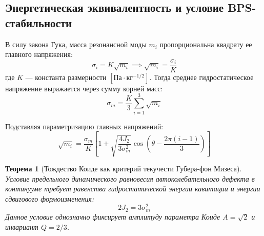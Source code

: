 \documentclass[12pt,a4paper]{article}
\newtheorem{theorem}{Теорема}
\begin{document}
	\subsection{Энергетическая эквивалентность и условие BPS-стабильности}
	В силу закона Гука, масса резонансной моды $m_i$ пропорциональна квадрату ее главного напряжения:
	\begin{equation}
		\sigma_i = K \sqrt{m_i} \implies \sqrt{m_i} = \frac{\sigma_i}{K}
	\end{equation}
	где $K$ — константа размерности $[\text{Па}\cdot\text{кг}^{-1/2}]$.
	Тогда среднее гидростатическое напряжение выражается через сумму корней масс:
	\begin{equation}
		\sigma_m = \frac{K}{3} \sum_{i=1}^3 \sqrt{m_i}
	\end{equation}
	
	Подставляя параметризацию главных напряжений:
	\begin{equation}
		\sqrt{m_i} = \frac{\sigma_m}{K} \left[ 1 + \sqrt{\frac{4 J_2}{3 \sigma_m^2}} \cos\left( \theta - \frac{2\pi(i-1)}{3} \right) \right]
	\end{equation}
	
	\begin{theorem}[Тождество Коиде как критерий текучести Губера-фон Мизеса]
		Условие предельного динамического равновесия автоколебательного дефекта в континууме требует равенства гидростатической энергии кавитации и энергии сдвигового формоизменения:
		\begin{equation}
			2 J_2 = 3 \sigma_m^2
		\end{equation}
		Данное условие однозначно фиксирует амплитуду параметра Коиде $A = \sqrt{2}$ и инвариант $Q = 2/3$.
	\end{theorem}
	
\end{document}
